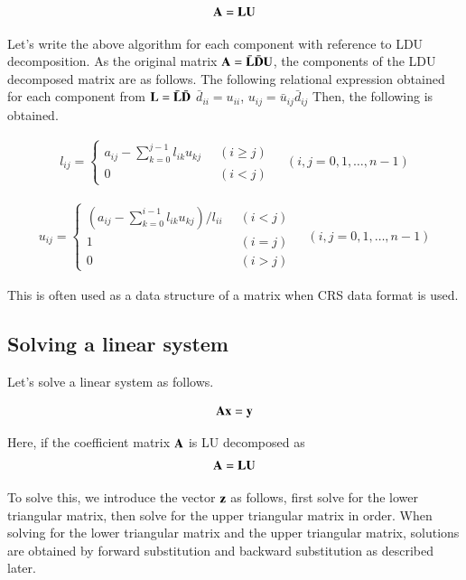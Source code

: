 \begin{equation}
\mathbf{A} = \mathbf{L}\mathbf{U}
\end{equation}

Let's write the above algorithm for each component with reference to LDU decomposition. As the original matrix $\mathbf{A}=\bar{\mathbf{L}}\bar{\mathbf{D}}\mathbf{U}$, the components of the LDU decomposed matrix are as follows. The following relational expression obtained for each component from $\mathbf{L} = \bar{\mathbf{L}}\bar{\mathbf{D}}$
$\bar{d}_{ii} = u_{ii}$, $u_{ij} = \bar{u}_{ij}\bar{d}_{ij}$
Then, the following is obtained.

\begin{eqnarray}
l_{ij} = \left\{\begin{array}{ll}
a_{ij} - \sum_{k=0}^{j-1} l_{ik} u_{kj}\;\; &  (i\ge j)\\
0 & (i<j)\end{array}\right.\;\;\;\; (i,j=0,1,\ldots,n-1)
\end{eqnarray}


\begin{eqnarray}
u_{ij} = \left\{\begin{array}{ll}
\left(a_{ij} - \sum_{k=0}^{i-1} l_{ik} u_{kj}\right)/l_{ii}\;\; & (i< j)\\
1 & (i=j) \\
0 & (i>j)\end{array}\right.\;\;\;\; (i,j=0,1,\ldots,n-1)
\end{eqnarray}

This is often used as a data structure of a matrix when CRS data format is used.

\subsection{Solving a linear system}

Let's solve a linear system as follows.

\begin{equation}
\mathbf{A}\mathbf{x} = \mathbf{y}
\end{equation}

Here, if the coefficient matrix $\mathbf{A}$ is LU decomposed as
%
\begin{equation}
\mathbf{A} = \mathbf{L}\mathbf{U}
\end{equation}

To solve this, we introduce the vector $\mathbf{z}$ as follows, first solve for the lower triangular matrix, then solve for the upper triangular matrix in order. When solving for the lower triangular matrix and the upper triangular matrix, solutions are obtained by forward substitution and backward substitution as described later.

